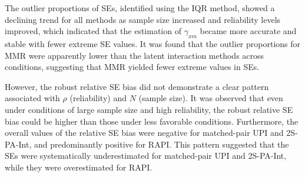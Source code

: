 \documentclass[
  man]{apa6}
\begin{document}
The outlier proportions of SEs, identified using the IQR method, showed a declining trend for all methods as sample size increased and reliability levels improved, which indicated that the estimation of \(\gamma_{xm}\) became more accurate and stable with fewer extreme SE values. It was found that the outlier proportions for MMR were apparently lower than the latent interaction methods across conditions, suggesting that MMR yielded fewer extreme values in SEs.

However, the robust relative SE bias did not demonstrate a clear pattern associated with \(\rho\) (reliability) and \(N\) (sample size). It was observed that even under conditions of large sample size and high reliability, the robust relative SE bias could be higher than those under less favorable conditions. Furthermore, the overall values of the relative SE bias were negative for matched-pair UPI and 2S-PA-Int, and predominantly positive for RAPI. This pattern suggested that the SEs were systematically underestimated for matched-pair UPI and 2S-PA-Int, while they were overestimated for RAPI.
\end{document}
